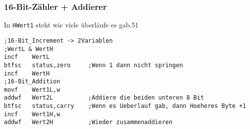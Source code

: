 \subsubsection*{16-Bit-Zähler + Addierer}
In \texttt{HWert1} steht wie viele überläufe es gab.51
\begin{lstlisting}[language=avr]
;16-Bit_Increment -> 2Variablen
;WertL & WertH
incf    WertL
btfsc   status,zero     ;Wenn 1 dann nicht springen 
incf    WertH
;16-Bit_Addition
movf    Wert1L,w 
addwf   Wert2L          ;Addiere die beiden unteren 8 Bit 
btfsc   status,carry    ;Wenn es Ueberlauf gab, dann Hoeheres Byte +1 
incf    Wert1H,w 
addwf   Wert2H          ;Wieder zusammenaddieren
\end{lstlisting}